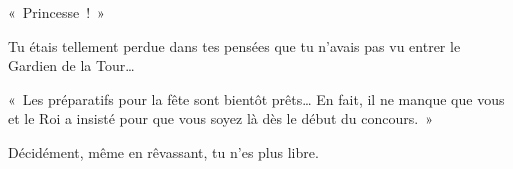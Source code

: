 {{«~Princesse~!~»

Tu étais tellement perdue dans tes pensées que tu n’avais pas vu entrer le Gardien de la Tour…

«~Les préparatifs pour la fête sont bientôt prêts…  En fait, il ne manque que vous et le Roi a insisté pour que vous soyez là dès le début du concours.~»

Décidément, même en rêvassant, tu n’es plus libre.
}

}

